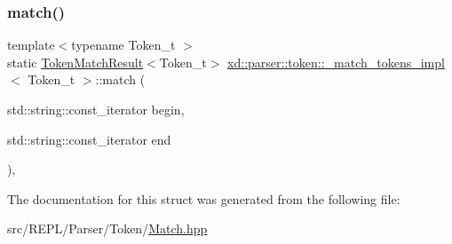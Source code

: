 \subsubsection{\texorpdfstring{match()}{match()}}
{\footnotesize\ttfamily template$<$typename Token\+\_\+t $>$ \\
static \mbox{\hyperlink{namespacexd_1_1parser_1_1token_a766c52bbfb7cb1f08498ef0bb9ec756e}{Token\+Match\+Result}}$<$Token\+\_\+t$>$ \mbox{\hyperlink{structxd_1_1parser_1_1token_1_1__match__tokens__impl}{xd\+::parser\+::token\+::\+\_\+match\+\_\+tokens\+\_\+impl}}$<$ Token\+\_\+t $>$\+::match (\begin{DoxyParamCaption}\item[{std\+::string\+::const\+\_\+iterator}]{begin,  }\item[{std\+::string\+::const\+\_\+iterator}]{end }\end{DoxyParamCaption})\hspace{0.3cm}{\ttfamily [inline]}, {\ttfamily [static]}}



The documentation for this struct was generated from the following file\+:\begin{DoxyCompactItemize}
\item 
src/\+R\+E\+P\+L/\+Parser/\+Token/\mbox{\hyperlink{_parser_2_token_2_match_8hpp}{Match.\+hpp}}\end{DoxyCompactItemize}
